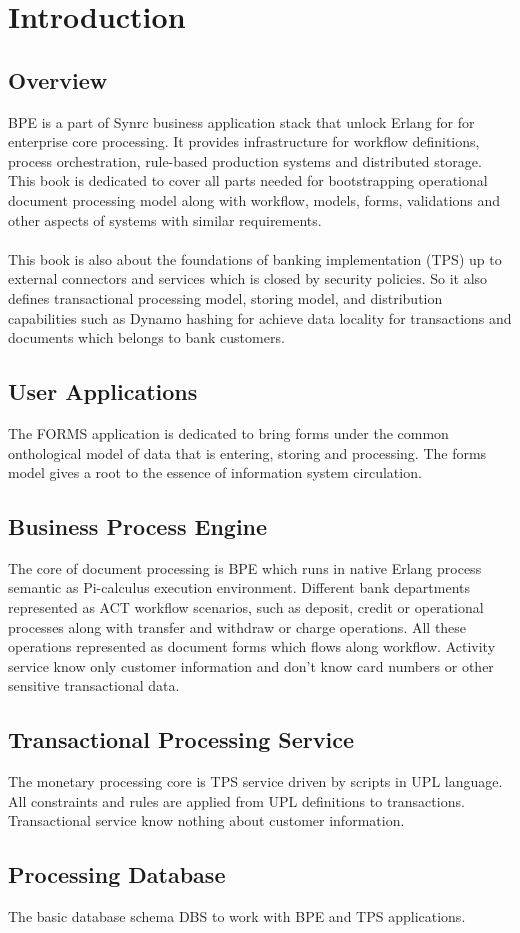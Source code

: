 \section{Introduction}

\subsection{Overview}
BPE is a part of Synrc business application stack that
unlock Erlang for for enterprise core processing.
It provides infrastructure for workflow definitions, process orchestration,
rule-based production systems and distributed storage. This book is dedicated to cover
all parts needed for bootstrapping operational document processing model along with
workflow, models, forms, validations and other aspects of systems with similar requirements.

\paragraph{}
This book is also about the foundations of banking implementation (TPS) up to external
connectors and services which is closed by security policies. So it also defines
transactional processing model, storing model, and distribution capabilities such as
Dynamo hashing for achieve data locality for transactions and documents which
belongs to bank customers.

\subsection{User Applications}
The FORMS application is dedicated to bring forms under the common
onthological model of data that is entering, storing and processing.
The forms model gives a root to the essence of information system circulation.

\subsection{Business Process Engine}
The core of document processing is BPE which runs in native Erlang process semantic
as Pi-calculus execution environment. Different bank departments represented
as ACT workflow scenarios, such as deposit, credit or operational processes along with
transfer and withdraw or charge operations. All these operations represented
as document forms which flows along workflow. Activity service know only
customer information and don't know card numbers or other sensitive transactional data.

\subsection{Transactional Processing Service}
The monetary processing core is TPS service driven by scripts in UPL language.
All constraints and rules are applied from UPL definitions to transactions.
Transactional service know nothing about customer information.

\subsection{Processing Database}
The basic database schema DBS to work with BPE and TPS applications.
